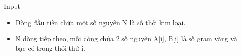 Input
\begin{itemize}
	\item     Dòng đầu tiên chứa một số nguyên N là số thỏi kim loại.   
	\item     N dòng tiếp theo, mỗi dòng chứa 2 số nguyên A[i], B[i] là số gram vàng và bạc có trong thỏi thứ i.   
\end{itemize}
